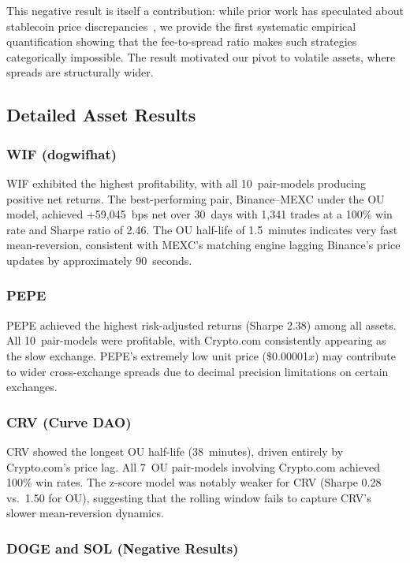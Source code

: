 \documentclass[sigconf,nonacm=false]{acmart}
\begin{document}
This negative result is itself a contribution: while prior work has speculated about stablecoin price discrepancies~\cite{makarov2020trading}, we provide the first systematic empirical quantification showing that the fee-to-spread ratio makes such strategies categorically impossible. The result motivated our pivot to volatile assets, where spreads are structurally wider.

\subsection{Detailed Asset Results}

\subsubsection{WIF (dogwifhat)}

WIF exhibited the highest profitability, with all 10~pair-models producing positive net returns. The best-performing pair, Binance--MEXC under the OU model, achieved +59,045~bps net over 30~days with 1,341 trades at a 100\% win rate and Sharpe ratio of 2.46. The OU half-life of 1.5~minutes indicates very fast mean-reversion, consistent with MEXC's matching engine lagging Binance's price updates by approximately 90~seconds.

\subsubsection{PEPE}

PEPE achieved the highest risk-adjusted returns (Sharpe 2.38) among all assets. All 10~pair-models were profitable, with Crypto.com consistently appearing as the slow exchange. PEPE's extremely low unit price (\$0.00001$x$) may contribute to wider cross-exchange spreads due to decimal precision limitations on certain exchanges.

\subsubsection{CRV (Curve DAO)}

CRV showed the longest OU half-life (38~minutes), driven entirely by Crypto.com's price lag. All 7~OU pair-models involving Crypto.com achieved 100\% win rates. The z-score model was notably weaker for CRV (Sharpe 0.28 vs.\ 1.50 for OU), suggesting that the rolling window fails to capture CRV's slower mean-reversion dynamics.

\subsubsection{DOGE and SOL (Negative Results)}
\end{document}
